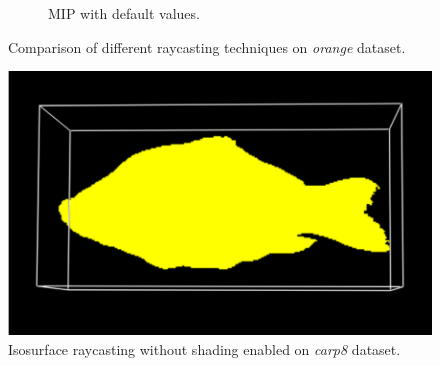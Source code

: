 \documentclass[a4paper]{article}
\begin{document}
\begin{figure}[h]
\begin{subfigure}[b]{0.45\textwidth}
    \caption{MIP with default values.}
  \end{subfigure}
  \caption{Comparison of different raycasting techniques on \textit{orange} dataset.}
  \label{fig:mipscomp}
\end{figure}

\begin{figure}[h]
  \centering
  \includegraphics[width=\textwidth]{iso-surface}
  \caption{Isosurface raycasting without shading enabled on \textit{carp8} dataset.}
  \label{fig:isosurface}
\end{figure}
\end{document}

